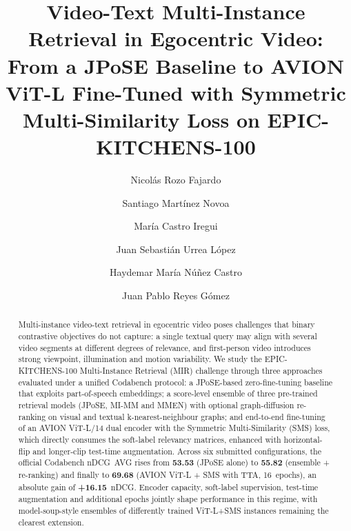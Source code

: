 \documentclass[runningheads]{llncs}
\begin{document}
%
\title{Video-Text Multi-Instance Retrieval in Egocentric Video: From a JPoSE Baseline to AVION ViT-L Fine-Tuned with Symmetric Multi-Similarity Loss on EPIC-KITCHENS-100}
%
%
\author{ Nicolás Rozo Fajardo \and
Santiago Martínez Novoa \and
María Castro Iregui \and Juan Sebastián Urrea López \and
Haydemar María Núñez Castro \and
Juan Pablo Reyes Gómez}
%
%
%
\maketitle              %
%

\begin{abstract}
Multi-instance video-text retrieval in egocentric video poses challenges that binary contrastive objectives do not capture: a single textual query may align with several video segments at different degrees of relevance, and first-person video introduces strong viewpoint, illumination and motion variability. We study the EPIC-KITCHENS-100 Multi-Instance Retrieval (MIR) challenge through three approaches evaluated under a unified Codabench protocol: a JPoSE-based zero-fine-tuning baseline that exploits part-of-speech embeddings; a score-level ensemble of three pre-trained retrieval models (JPoSE, MI-MM and MMEN) with optional graph-diffusion re-ranking on visual and textual k-nearest-neighbour graphs; and end-to-end fine-tuning of an AVION ViT-L/14 dual encoder with the Symmetric Multi-Similarity (SMS) loss, which directly consumes the soft-label relevancy matrices, enhanced with horizontal-flip and longer-clip test-time augmentation. Across six submitted configurations, the official Codabench nDCG~AVG rises from \textbf{53.53} (JPoSE alone) to \textbf{55.82} (ensemble + re-ranking) and finally to \textbf{69.68} (AVION ViT-L + SMS with TTA, 16~epochs), an absolute gain of \textbf{+16.15}~nDCG. Encoder capacity, soft-label supervision, test-time augmentation and additional epochs jointly shape performance in this regime, with model-soup-style ensembles of differently trained ViT-L+SMS instances remaining the clearest extension.

\end{abstract}
\end{document}
